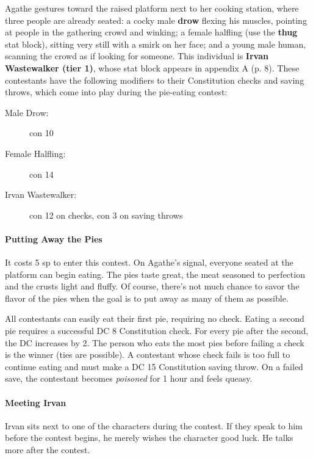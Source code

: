 \documentclass[a4paper, 11pt, bg=full, twocolumn, nooutline]{dndbook}
\begin{document}
Agathe gestures toward the raised platform next to her cooking station, where three people are already seated: a cocky male \textbf{drow} flexing his muscles, pointing at people in the gathering crowd and winking; a female halfling (use the \textbf{thug} stat block), sitting very still with a smirk on her face; and a young male human, scanning the crowd as if looking for someone. This individual is \textbf{Irvan Wastewalker (tier 1)}, whose stat block appears in appendix A (p. 8). These contestants have the following modifiers to their Constitution checks and saving throws, which come into play during the pie-eating contest:

\begin{description}
\item[Male Drow:] con 10
\item[Female Halfling:] con 14
\item[Irvan Wastewalker:] con 12 on checks, con 3 on saving throws
\end{description}

\paragraph{Putting Away the Pies}

It costs 5 sp to enter this contest. On Agathe's signal, everyone seated at the platform can begin eating. The pies taste great, the meat seasoned to perfection and the crusts light and fluffy. Of course, there's not much chance to savor the flavor of the pies when the goal is to put away as many of them as possible.

All contestants can easily eat their first pie, requiring no check. Eating a second pie requires a successful DC 8 Constitution check. For every pie after the second, the DC increases by 2. The person who eats the most pies before failing a check is the winner (ties are possible). A contestant whose check fails is too full to continue eating and must make a DC 15 Constitution saving throw. On a failed save, the contestant becomes \textit{poisoned} for 1 hour and feels queasy.

\paragraph{Meeting Irvan}

Irvan sits next to one of the characters during the contest. If they speak to him before the contest begins, he merely wishes the character good luck. He talks more after the contest.
\end{document}
